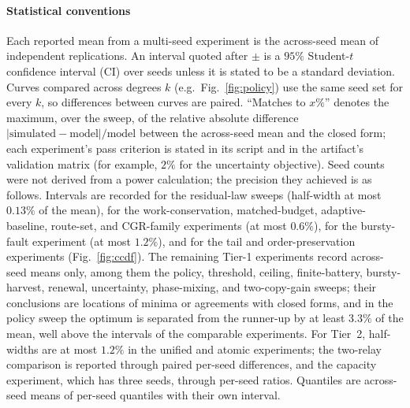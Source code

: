 \documentclass[twocolumn,3p,times,procedia]{elsarticle}
\theoremstyle{plain}
\theoremstyle{remark}
\begin{document}
\paragraph*{Statistical conventions}
Each reported mean from a multi-seed experiment is the across-seed mean
of independent replications. An interval quoted after $\pm$ is a $95\%$
Student-$t$ confidence interval (CI) over seeds unless it is stated to
be a standard deviation.
Curves compared across degrees $k$ (e.g.\ Fig.~\ref{fig:policy}) use
the same seed set for every $k$, so differences between curves are
paired. ``Matches to $x\%$'' denotes the maximum, over the sweep, of the
relative absolute difference $|\text{simulated}-\text{model}|/\text{model}$
between the across-seed mean and the closed form; each experiment's
pass criterion is stated in its script and in the artifact's validation
matrix (for example, $2\%$ for the uncertainty objective). Seed counts
were not derived from a power calculation; the precision they achieved
is as follows. Intervals are recorded for the
residual-law sweeps (half-width at most $0.13\%$ of the mean), for the
work-conservation, matched-budget, adaptive-baseline, route-set, and
CGR-family experiments (at most $0.6\%$), for the bursty-fault
experiment (at most $1.2\%$), and for the tail and order-preservation
experiments (Fig.~\ref{fig:ccdf}). The remaining Tier-1 experiments
record across-seed means only, among them the policy, threshold,
ceiling, finite-battery, bursty-harvest, renewal, uncertainty,
phase-mixing, and two-copy-gain sweeps; their conclusions are locations of minima or agreements
with closed forms, and in the policy sweep the optimum is separated
from the runner-up by at least $3.3\%$ of the mean, well above the
intervals of the comparable experiments. For Tier~2, half-widths are at
most $1.2\%$ in the unified and atomic experiments; the two-relay
comparison is reported through paired per-seed differences, and the
capacity experiment, which has three seeds, through per-seed ratios.
Quantiles are across-seed means of per-seed quantiles with their own
interval.
\end{document}
